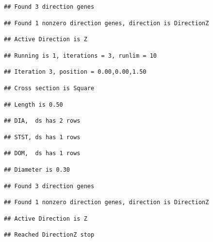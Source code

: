 \documentclass[]{article}
\begin{document}
\begin{verbatim}
## Found 3 direction genes
\end{verbatim}

\begin{verbatim}
## Found 1 nonzero direction genes, direction is DirectionZ
\end{verbatim}

\begin{verbatim}
## Active Direction is Z
\end{verbatim}

\begin{verbatim}
## Running is 1, iterations = 3, runlim = 10
\end{verbatim}

\begin{verbatim}
## Iteration 3, position = 0.00,0.00,1.50
\end{verbatim}

\begin{verbatim}
## Cross section is Square
\end{verbatim}

\begin{verbatim}
## Length is 0.50
\end{verbatim}

\begin{verbatim}
## DIA,  ds has 2 rows
\end{verbatim}

\begin{verbatim}
## STST, ds has 1 rows
\end{verbatim}

\begin{verbatim}
## DOM,  ds has 1 rows
\end{verbatim}

\begin{verbatim}
## Diameter is 0.30
\end{verbatim}

\begin{verbatim}
## Found 3 direction genes
\end{verbatim}

\begin{verbatim}
## Found 1 nonzero direction genes, direction is DirectionZ
\end{verbatim}

\begin{verbatim}
## Active Direction is Z
\end{verbatim}

\begin{verbatim}
## Reached DirectionZ stop
\end{verbatim}
\end{document}

